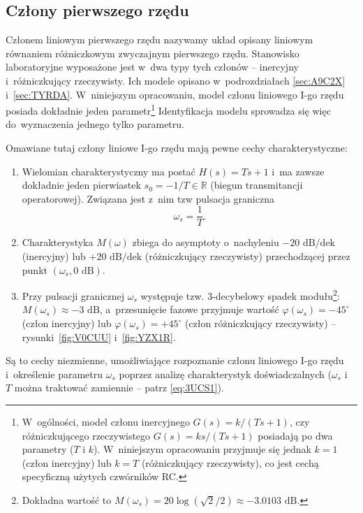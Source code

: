 \documentclass[paper=a4,DIV=12]{lpas}
\newcommand{\degree}{^{\circ}}
\begin{document}
\begin{appendices}
  \subsection{Człony pierwszego rzędu}
  \label{sec:LDB7J}

  Członem liniowym pierwszego rzędu nazywamy układ opisany liniowym równaniem
  różniczkowym zwyczajnym pierwszego rzędu. Stanowisko laboratoryjne wyposażone
  jest w~dwa typy tych członów -- inercyjny i~różniczkujący rzeczywisty. Ich
  modele opisano w~podrozdziałach \ref{sec:A9C2X} i~\ref{sec:TYRDA}.
  W~niniejszym opracowaniu, model członu liniowego I-go rzędu posiada dokładnie
  jeden parametr\footnote{W~ogólności, model członu inercyjnego $G(s) = k/(Ts +
  1)$, czy różniczkującego rzeczywistego $G(s) = ks/(Ts + 1)$ posiadają po dwa
  parametry ($T$ i $k$). W~niniejszym opracowaniu przyjmuje się jednak $k = 1$
  (człon inercyjny) lub $k=T$ (różniczkujący rzeczywisty), co jest cechą
  specyficzną użytych czwórników RC.} Identyfikacja modelu sprowadza się więc
  do~wyznaczenia jednego tylko parametru.

  Omawiane tutaj człony liniowe I-go rzędu mają pewne cechy charakterystyczne:
  \begin{enumerate}
    \item Wielomian charakterystyczny ma postać $H(s) = Ts+1$ i~ma zawsze
      dokładnie jeden pierwiastek $s_0 = -1/T \in \mathbb{R}$ (biegun
      transmitancji operatorowej). Związana jest z~nim tzw pulsacja graniczna
      \begin{equation}
        \omega_s = \frac{1}{T}.
        \label{eq:3UCS1}
      \end{equation}
    \item Charakterystyka $M(\omega)$ zbiega do asymptoty o~nachyleniu
      $-20\text{ dB/dek}$ (inercyjny) lub $+20\text{ dB/dek}$ (różniczkujący
      rzeczywisty) przechodzącej przez punkt $(\omega_s,0\text{ dB})$.
    \item Przy pulsacji granicznej $\omega_s$ występuje tzw. 3-decybelowy spadek
      modułu\footnote{Dokładna wartość to $M(\omega_s) = 20 \log{(\sqrt{2}/2)}
      \approx -3.0103\text{ dB}$.}: $M(\omega_s) \approx -3\text{ dB}$,
      a~przesunięcie fazowe przyjmuje wartość $\varphi(\omega_s) = -45\degree$
      (człon inercyjny) lub $\varphi(\omega_s) = +45\degree$ (człon
      różniczkujący rzeczywisty) -- rysunki~\ref{fig:V0CUU} i~\ref{fig:YZX1R}.
  \end{enumerate}
  Są to cechy niezmienne, umożliwiające rozpoznanie członu liniowego I-go rzędu
  i~określenie parametru $\omega_s$ poprzez analizę charakterystyk
  doświadczalnych ($\omega_s$ i~$T$ można traktować zamiennie -- patrz \eqref{eq:3UCS1}).


\end{appendices}
\end{document}
